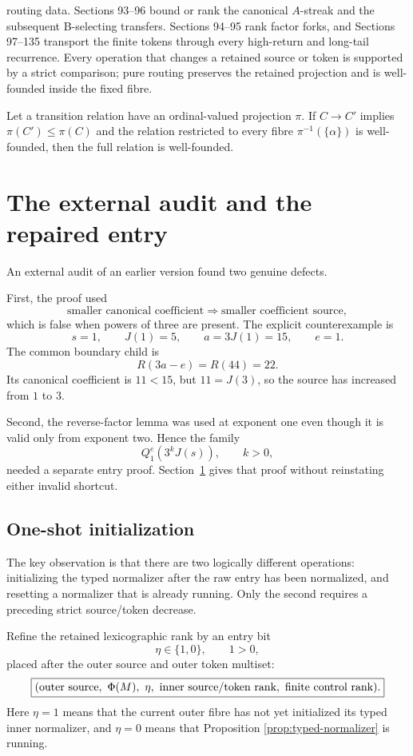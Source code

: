 routing data. Sections 93--96 bound or rank the canonical $A$-streak and the
subsequent B-selecting transfers. Sections 94--95 rank factor forks, and
Sections 97--135 transport the finite tokens through every high-return and
long-tail recurrence. Every operation that changes a retained source or token
is supported by a strict comparison; pure routing preserves the retained
projection and is well-founded inside the fixed fibre.

\begin{lemma}\label{lem:fibre}
Let a transition relation have an ordinal-valued projection $\pi$. If
$C\to C'$ implies $\pi(C')\le\pi(C)$ and the relation restricted to every
fibre $\pi^{-1}(\{\alpha\})$ is well-founded, then the full relation is
well-founded.
\end{lemma}

\section{The external audit and the repaired entry}\label{sec:audit}

An external audit of an earlier version found two genuine defects.

First, the proof used
\[
 \text{smaller canonical coefficient}
 \Longrightarrow
 \text{smaller coefficient source},
\]
which is false when powers of three are present. The explicit counterexample
is
\[
 s=1,\qquad J(1)=5,\qquad a=3J(1)=15,\qquad e=1.
\]
The common boundary child is
\[
 R(3a-e)=R(44)=22.
\]
Its canonical coefficient is $11<15$, but $11=J(3)$, so the source has
increased from $1$ to $3$.

Second, the reverse-factor lemma was used at exponent one even though it is
valid only from exponent two. Hence the family
\[
 Q_1^e(3^kJ(s)),\qquad k>0,
\]
needed a separate entry proof. Section~\ref{sec:audit} gives that proof
without reinstating either invalid shortcut.

\subsection{One-shot initialization}

The key observation is that there are two logically different operations:
initializing the typed normalizer after the raw entry has been normalized,
and resetting a normalizer that is already running. Only the second requires
a preceding strict source/token decrease.

Refine the retained lexicographic rank by an entry bit
\[
 \eta\in\{1,0\},\qquad 1>0,
\]
placed after the outer source and outer token multiset:
\[
 \boxed{
 (\text{outer source},\ \Phi(M),\ \eta,\
   \text{inner source/token rank},\ \text{finite control rank}).}
\]
Here $\eta=1$ means that the current outer fibre has not yet initialized its
typed inner normalizer, and $\eta=0$ means that Proposition
\ref{prop:typed-normalizer} is running.

